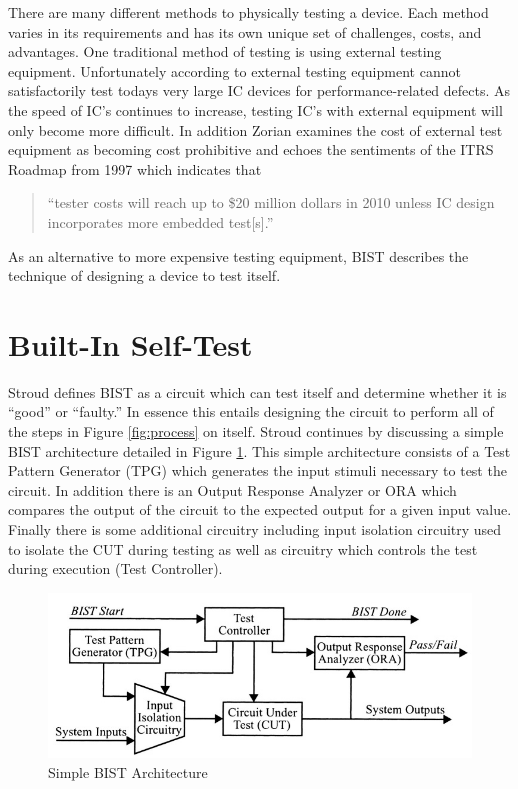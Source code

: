 \documentclass[12pt]{report}
\begin{document}
There are many different methods to physically testing a device.  Each method varies in its requirements and has its own unique set of challenges, costs, and advantages.  One traditional method of testing is using external testing equipment.  Unfortunately according to \cite{zorian} external testing equipment cannot satisfactorily test todays very large IC devices for performance-related defects.  As the speed of IC's continues to increase, testing IC's with external equipment will only become more difficult\cite{zorian}.  In addition Zorian examines the cost of external test equipment as becoming cost prohibitive and echoes the sentiments of the ITRS Roadmap from 1997 which indicates that 
\begin{quote}
``tester costs will reach up to \$20 million dollars in 2010 unless IC design incorporates more embedded test[s].\cite{itrs}''
\end{quote}
As an alternative to more expensive testing equipment, BIST describes the technique of designing a device to test itself\cite{stroud}.

\section{Built-In Self-Test}
Stroud defines BIST as a circuit which can test itself and determine whether it is ``good'' or ``faulty.''  In essence this entails designing the circuit to perform all of the steps in Figure \ref{fig:process} on itself.  Stroud continues by discussing a simple BIST architecture detailed in Figure \ref{fig:bist}.  This simple architecture consists of a Test Pattern Generator (TPG) which generates the input stimuli necessary to test the circuit.  In addition there is an Output Response Analyzer or ORA which compares the output of the circuit to the expected output for a given input value.  Finally there is some additional circuitry including input isolation circuitry used to isolate the CUT during testing as well as circuitry which controls the test during execution (Test Controller).
\begin{figure}
	\begin{center}
		\includegraphics[scale=1]{images/bist-architecture}
	\end{center}
	\caption{Simple BIST Architecture\cite{stroud}}
	\label{fig:bist}
\end{figure}
\end{document}
